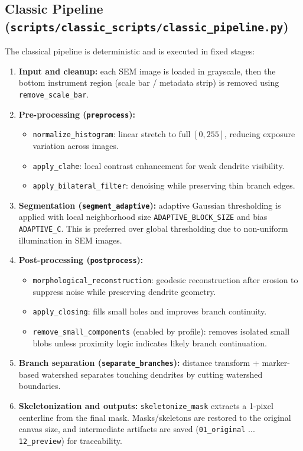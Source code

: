 \documentclass[11pt,a4paper]{article}
\begin{document}
\subsection*{Classic Pipeline (\texttt{scripts/classic\_scripts/classic\_pipeline.py})}
The classical pipeline is deterministic and is executed in fixed stages:
\begin{enumerate}
\item \textbf{Input and cleanup:}
each SEM image is loaded in grayscale, then the bottom instrument region (scale bar / metadata strip) is removed using \texttt{remove\_scale\_bar}.

\item \textbf{Pre-processing (\texttt{preprocess}):}
\begin{itemize}
\item \texttt{normalize\_histogram}: linear stretch to full \([0,255]\), reducing exposure variation across images.
\item \texttt{apply\_clahe}: local contrast enhancement for weak dendrite visibility.
\item \texttt{apply\_bilateral\_filter}: denoising while preserving thin branch edges.
\end{itemize}

\item \textbf{Segmentation (\texttt{segment\_adaptive}):}
adaptive Gaussian thresholding is applied with local neighborhood size \texttt{ADAPTIVE\_BLOCK\_SIZE} and bias \texttt{ADAPTIVE\_C}. This is preferred over global thresholding due to non-uniform illumination in SEM images.

\item \textbf{Post-processing (\texttt{postprocess}):}
\begin{itemize}
\item \texttt{morphological\_reconstruction}: geodesic reconstruction after erosion to suppress noise while preserving dendrite geometry.
\item \texttt{apply\_closing}: fills small holes and improves branch continuity.
\item \texttt{remove\_small\_components} (enabled by profile): removes isolated small blobs unless proximity logic indicates likely branch continuation.
\end{itemize}

\item \textbf{Branch separation (\texttt{separate\_branches}):}
distance transform + marker-based watershed separates touching dendrites by cutting watershed boundaries.

\item \textbf{Skeletonization and outputs:}
\texttt{skeletonize\_mask} extracts a 1-pixel centerline from the final mask. Masks/skeletons are restored to the original canvas size, and intermediate artifacts are saved (\texttt{01\_original} ... \texttt{12\_preview}) for traceability.
\end{enumerate}
\end{document}
